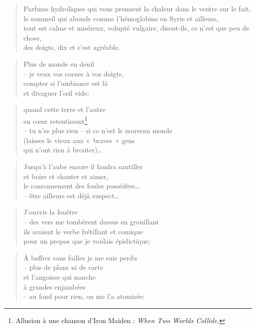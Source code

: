   \begin{verse}
    Parfums hydroliques qui vous prennent la chaleur dans le ventre sur le fait,\\
    le sommeil qui abonde comme l’hémoglobine en Syrie et ailleurs,\\
    tout est calme et miséreux, volupté vulgaire, disent-ils, ce n’est que 
    peu de chose,\\
    des doigts, dix et c’est agréable.
  \end{verse}
  \begin{verse}
    Plus de monde en deuil\\
    -- je veux vos cornes à vos doigts,\\
    compter si l’ambiance est là\\
    et divaguer l’œil vide;
  \end{verse}
  \begin{verse}
    quand cette terre et l’autre\\
    en cœur retentissent\footnote{Allusion à une chanson d’Iron Maiden : \emph{When Two Worlds Collide}.}\\
    -- tu n’es plus rien -- si ce n’est le nouveau monde\\
    (laisses le vieux aux «~braves~» gens\\
    qui n’ont rien à brouter)…
  \end{verse}
  \begin{verse}
    Jusqu’à l’aube encore il faudra sautiller\\
    et boire et chanter et aimer,\\
    le ronronnement des foules possédées…\\
    -- être ailleurs est déjà suspect…
  \end{verse}
  \begin{verse}
    J’ouvris la fenêtre\\
    -- des vers me tombèrent dessus en grouillant\\
    ils avaient le verbe frétillant et comique\\
    pour un propos que je voulais épidictique;
  \end{verse}
  \begin{verse}
    À baffrer sans failles je me suis perdu\\
    -- plus de plans ni de carte\\
    et l’angoisse qui marche\\
    à grandes enjambées\\
    -- au fond pour rien, on me l’a atomisée:
  \end{verse}
